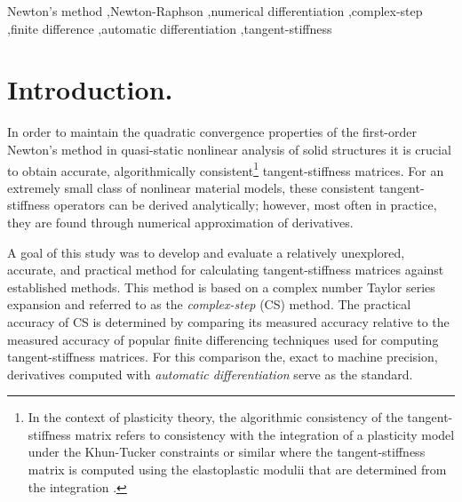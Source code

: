 \documentclass[preprint,12pt]{elsarticle}
\begin{document}
\begin{frontmatter}
\begin{abstract}
\end{abstract}

\begin{keyword}
Newton's method \sep Newton-Raphson \sep numerical differentiation \sep complex-step \sep finite difference \sep automatic differentiation \sep tangent-stiffness
\end{keyword}

\end{frontmatter}



\section{Introduction.}
\label{sec:intro} 

In order to maintain the quadratic convergence properties of the first-order Newton's method \cite{belytschko1999nonlinear} \cite[Ch.~13]{young2009} in quasi-static nonlinear analysis of solid structures it is crucial to obtain accurate, algorithmically consistent\footnote{In the context of plasticity theory, the algorithmic consistency of the tangent-stiffness matrix refers to consistency with the integration of a plasticity model under the Khun-Tucker constraints or similar where the tangent-stiffness matrix is computed using the elastoplastic modulii that are determined from the integration \cite{simo1998}.} tangent-stiffness matrices. For an extremely small class of nonlinear material models, these consistent tangent-stiffness operators can be derived analytically; however, most often in practice, they are found through numerical approximation of derivatives. 

A goal of this study was to develop and evaluate a  relatively unexplored, accurate, and practical method for calculating tangent-stiffness matrices against established methods.  This   method is based on a complex number Taylor series expansion and referred to as the \emph{complex-step} (CS) method. The practical accuracy of CS is determined by comparing its measured accuracy relative to the measured accuracy of popular finite differencing techniques used for computing tangent-stiffness matrices. For this comparison the,  exact to machine precision, derivatives computed with \emph{automatic differentiation} serve as the standard.
\end{document}
